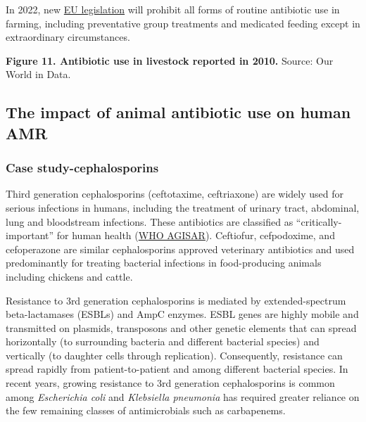 \documentclass[
]{book}
\begin{document}
In 2022, new \href{https://eur-lex.europa.eu/legal-content/EN/TXT/PDF/?uri=CELEX:32019R0006\&from=EN}{EU legislation} will prohibit all forms of routine antibiotic use in farming, including preventative group treatments and medicated feeding except in extraordinary circumstances.

\textbf{Figure 11. Antibiotic use in livestock reported in 2010.} Source: Our World in Data.

\hypertarget{the-impact-of-animal-antibiotic-use-on-human-amr}{%
\subsection*{The impact of animal antibiotic use on human AMR}\label{the-impact-of-animal-antibiotic-use-on-human-amr}}

\hypertarget{case-study-cephalosporins}{%
\subsubsection*{Case study-cephalosporins}\label{case-study-cephalosporins}}

Third generation cephalosporins (ceftotaxime, ceftriaxone) are widely used for serious infections in humans, including the treatment of urinary tract, abdominal, lung and bloodstream infections. These antibiotics are classified as ``critically-important'' for human health (\href{http://www.agisar.org/}{WHO AGISAR}). Ceftiofur, cefpodoxime, and cefoperazone are similar cephalosporins approved veterinary antibiotics and used predominantly for treating bacterial infections in food-producing animals including chickens and cattle.

Resistance to 3rd generation cephalosporins is mediated by extended-spectrum beta-lactamases (ESBLs) and AmpC enzymes. ESBL genes are highly mobile and transmitted on plasmids, transposons and other genetic elements that can spread horizontally (to surrounding bacteria and different bacterial species) and vertically (to daughter cells through replication). Consequently, resistance can spread rapidly from patient-to-patient and among different bacterial species. In recent years, growing resistance to 3rd generation cephalosporins is common among \emph{Escherichia coli} and \emph{Klebsiella pneumonia} has required greater reliance on the few remaining classes of antimicrobials such as carbapenems.
\end{document}

